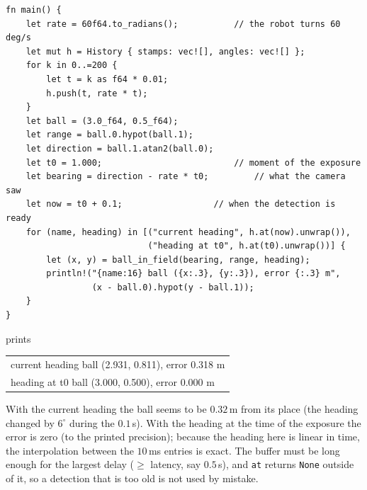 \begin{enumerate}[label=\textbf{\ansnum.\arabic*}]
\begin{verbatim}
fn main() {
    let rate = 60f64.to_radians();           // the robot turns 60 deg/s
    let mut h = History { stamps: vec![], angles: vec![] };
    for k in 0..=200 {
        let t = k as f64 * 0.01;
        h.push(t, rate * t);
    }
    let ball = (3.0_f64, 0.5_f64);
    let range = ball.0.hypot(ball.1);
    let direction = ball.1.atan2(ball.0);
    let t0 = 1.000;                          // moment of the exposure
    let bearing = direction - rate * t0;         // what the camera saw
    let now = t0 + 0.1;                  // when the detection is ready
    for (name, heading) in [("current heading", h.at(now).unwrap()),
                            ("heading at t0", h.at(t0).unwrap())] {
        let (x, y) = ball_in_field(bearing, range, heading);
        println!("{name:16} ball ({x:.3}, {y:.3}), error {:.3} m",
                 (x - ball.0).hypot(y - ball.1));
    }
}
\end{verbatim}
prints
\begin{center}\small\ttfamily
\begin{tabular}{@{}l@{}}
current heading  ball (2.931, 0.811), error 0.318 m\\
heading at t0    ball (3.000, 0.500), error 0.000 m
\end{tabular}
\end{center}
With the current heading the ball seems to be $0.32$\,m from its place (the heading changed by $6^{\circ}$ during the $0.1$\,s). With the heading at the time of the exposure the error is zero (to the printed precision); because the heading here is linear in time, the interpolation between the $10$\,ms entries is exact. The buffer must be long enough for the largest delay ($\ge$ latency, say $0.5$\,s), and \verb!at! returns \verb!None! outside of it, so a detection that is too old is not used by mistake.
\end{enumerate}
